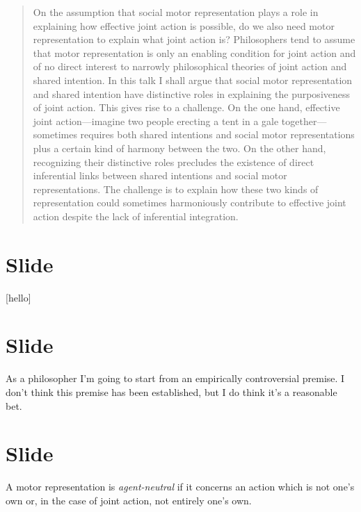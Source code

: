 \documentclass[12pt,\papersize]{extarticle}
\begin{document}
\setlength\footnotesep{1em}


\maketitle
\title{}

\begin{abstract}
On the assumption that social motor representation plays a role in explaining how effective joint action is possible, do we also need motor representation to explain what joint action is?  Philosophers tend to assume that motor representation is only an enabling condition for joint action and of no direct interest to narrowly philosophical theories of joint action and shared intention.  In this talk I shall argue that social motor representation and shared intention  have distinctive roles in explaining the purposiveness of joint action.  This gives rise to a challenge.  On the one hand, effective joint action---imagine two people erecting a tent in a gale together---sometimes requires both shared intentions and social motor representations plus a certain kind of harmony between the two.  On the other hand, recognizing their distinctive roles precludes the existence of direct inferential links between shared intentions and social motor representations.  The challenge is to explain how these two kinds of representation could sometimes harmoniously contribute to effective joint action despite the lack of inferential integration.
\end{abstract}

\section{Slide}
[hello]

\section{Slide}
As a philosopher I’m going to start from an empirically controversial premise.
I don’t think this premise has been established, but I do think it’s a reasonable bet.


\section{Slide}
A motor representation is \emph{agent-neutral} if it concerns an action which is not one’s own or, in the case of joint action, not entirely one’s own.
\end{document}
